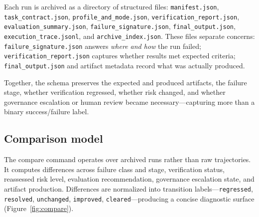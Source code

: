 \documentclass[11pt]{article}
\begin{document}
Each run is archived as a directory of structured files: \texttt{manifest.json}, \texttt{task\_contract.json}, \texttt{profile\_and\_mode.json}, \texttt{verification\_report.json}, \texttt{evaluation\_summary.json}, \texttt{failure\_signature.json}, \texttt{final\_output.json}, \texttt{execution\_trace.jsonl}, and \texttt{archive\_index.json}. These files separate concerns: \texttt{failure\_signature.json} answers \emph{where and how} the run failed; \texttt{verification\_report.json} captures whether results met expected criteria; \texttt{final\_output.json} and artifact metadata record what was actually produced.

Together, the schema preserves the expected and produced artifacts, the failure stage, whether verification regressed, whether risk changed, and whether governance escalation or human review became necessary---capturing more than a binary success/failure label.

\subsection{Comparison model}

The compare command operates over archived runs rather than raw trajectories. It computes differences across failure class and stage, verification status, reassessed risk level, evaluation recommendation, governance escalation state, and artifact production. Differences are normalized into transition labels---\texttt{regressed}, \texttt{resolved}, \texttt{unchanged}, \texttt{improved}, \texttt{cleared}---producing a concise diagnostic surface (Figure~\ref{fig:compare}).
\end{document}
